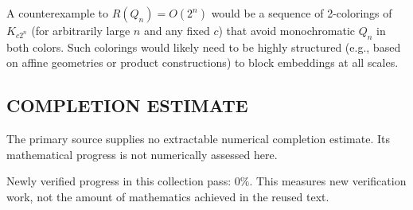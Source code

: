 A counterexample to $R(Q_n)=O(2^n)$ would be a sequence of 2-colorings of $K_{c2^n}$ (for arbitrarily large $n$ and any fixed $c$) that avoid monochromatic $Q_n$ in both colors. Such colorings would likely need to be highly structured (e.g., based on affine geometries or product constructions) to block embeddings at all scales.


\subsection*{COMPLETION ESTIMATE}
The primary source supplies no extractable numerical completion estimate. Its mathematical progress is not numerically assessed here.

Newly verified progress in this collection pass: $0\%$. This measures new verification work, not the amount of mathematics achieved in the reused text.
